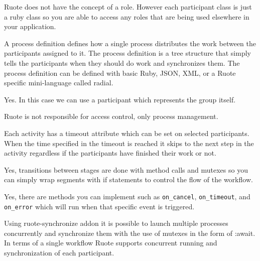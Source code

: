 \documentclass[document.tex]{subfiles}
\begin{document}

Ruote does not have the concept of a role. However each participant class is just a ruby class so you are able to access any roles that are being used elsewhere in your application.


A process definition defines how a single process distributes the work between the participants assigned to it. The process definition is a tree structure that simply tells the participants when they should do work and synchronizes them. The process definition can be defined with basic Ruby, JSON, XML, or a Ruote specific mini-language called radial.


Yes. In this case we can use a participant which represents the group itself.


Ruote is not responsible for access control, only process management.


Each activity has a timeout attribute which can be set on selected participants. When the time specified in the timeout is reached it skips to the next step in the activity regardless if the participants have finished their work or not.


Yes, transitions between stages are done with method calls and mutexes so you can simply wrap segments with if statements to control the flow of the workflow.


Yes, there are methods you can implement such as \verb!on_cancel!, \verb!on_timeout!, and \verb!on_error! which will run when that specific event is triggered.


Using ruote-synchronize addon it is possible to launch multiple processes concurrently and synchronize them with the use of mutexes in the form of :await. In terms of a single workflow Ruote supports concurrent running and synchronization of each participant.
\end{document}
